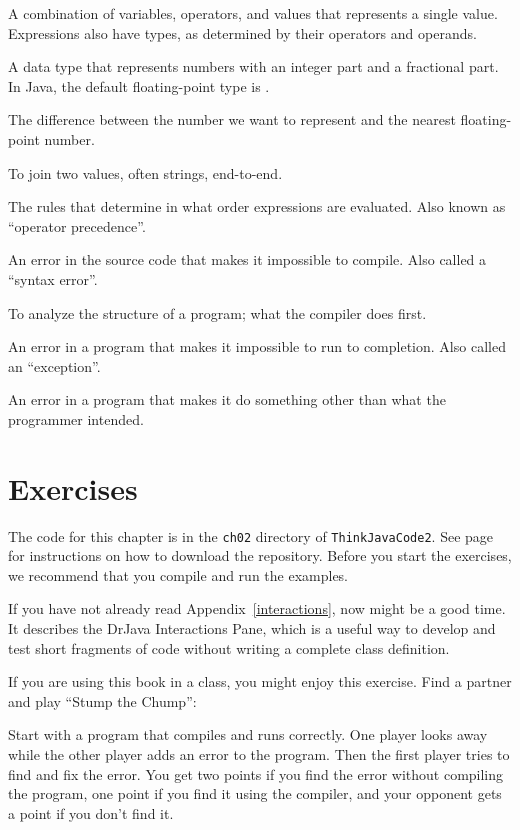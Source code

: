 \begin{description}
A combination of variables, operators, and values that represents a single value.
Expressions also have types, as determined by their operators and operands.

A data type that represents numbers with an integer part and a fractional part.
In Java, the default floating-point type is .

The difference between the number we want to represent and the nearest floating-point number.

To join two values, often strings, end-to-end.

The rules that determine in what order expressions are evaluated.
Also known as ``operator precedence''.

An error in the source code that makes it impossible to compile.
Also called a ``syntax error''.

To analyze the structure of a program; what the compiler does first.

An error in a program that makes it impossible to run to completion.
Also called an ``exception''.

An error in a program that makes it do something other than what the programmer intended.

\end{description}


\section{Exercises}

The code for this chapter is in the {\tt ch02} directory of {\tt ThinkJavaCode2}.
See page~\pageref{code} for instructions on how to download the repository.
Before you start the exercises, we recommend that you compile and run the examples.

If you have not already read Appendix~\ref{interactions}, now might be a good time.
It describes the DrJava Interactions Pane, which is a useful way to develop and test short fragments of code without writing a complete class definition.


\begin{exercise}  %

If you are using this book in a class, you might enjoy this exercise.
Find a partner and play ``Stump the Chump'':

Start with a program that compiles and runs correctly.
One player looks away while the other player adds an error to the program.
Then the first player tries to find and fix the error.
You get two points if you find the error without compiling the program, one point if you find it using the compiler, and your opponent gets a point if you don't find it.

\end{exercise}


